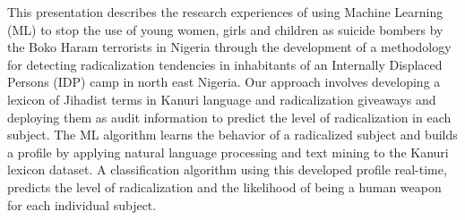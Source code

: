 This presentation describes the research experiences of using Machine Learning (ML) to stop the use of young women, girls and children as suicide bombers by the Boko Haram terrorists in Nigeria through the development of a methodology for detecting radicalization tendencies in inhabitants of an Internally Displaced Persons (IDP) camp in north east Nigeria. Our approach involves developing a lexicon of Jihadist terms in Kanuri language and radicalization giveaways and deploying them as audit information to predict the level of radicalization in each subject. The ML algorithm learns the behavior of a radicalized subject and builds a profile by applying natural language processing and text mining to the Kanuri lexicon dataset. A classification algorithm using this developed profile real-time, predicts the level of radicalization and the likelihood of being a human weapon for each individual subject.
